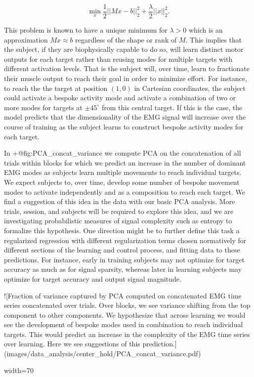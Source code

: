 \documentclass[../main.tex]{subfiles}
\begin{document}
{{{{{{{{{{$$
\min_x\frac{1}{2}||Mx - b||^2_2 + \frac{\lambda}{2}||x||_2^2.
$$

This problem is known to have a unique minimum for $\lambda>0$ which is an approximation $Mx\approx b$ regardless of the shape or rank of $M$. This implies that the subject, if they are biophysically capable to do so, will learn distinct motor outputs for each target rather than reusing modes for multiple targets with different activation levels. That is the subject will, over time, learn to fractionate their muscle output to reach their goal in order to minimize effort. For instance, to reach the the target at position $(1,0)$ in Cartesian coordinates, the subject could activate a bespoke activity mode and activate a combination of two or more modes for targets at $\pm45^\circ$ from this central target. If this is the case, the model predicts that the dimensionality of the EMG signal will increase over the course of training as the subject learns to construct bespoke activity modes for each target.

In {+@fig:PCA_concat_variance} we compute PCA on the concatenation of all trials within blocks for which we predict an increase in the number of dominant EMG modes as subjects learn multiple movements to reach individual targets. We expect subjects to, over time, develop some number of bespoke movement modes to activate independently and as a composition to reach each target. We find a suggestion of this idea in the data with our basic PCA analysis. More trials, session, and subjects will be required to explore this idea, and we are investigating probabilistic measures of signal complexity such as entropy to formalize this hypothesis. One direction might be to further define this task a regularized regression with different regularization terms chosen normatively for different sections of the learning and control process, and fitting data to these predictions. For instance, early in training subjects may not optimize for target accuracy as much as for signal sparsity, whereas later in learning subjects may optimize for target accuracy and output signal magnitude.

![Fraction of variance captured by PCA computed on concatenated EMG time series concatenated over trials. Over blocks, we see variance shifting from the top component to other components. We hypothesize that across learning we would see the development of bespoke modes used in combination to reach individual targets. This would predict an increase in the complexity of the EMG time series over learning. Here we see suggestions of this prediction.](images/data_analysis/center_hold/PCA_concat_variance.pdf){width=70%

}}}}}}}}}}}
\end{document}
